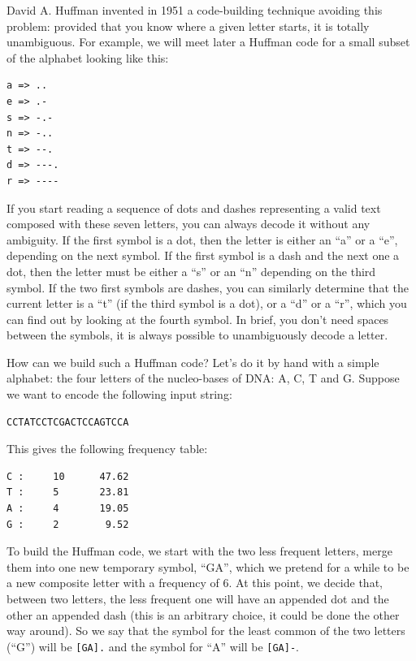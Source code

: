 David A. Huffman invented in 1951 a code-building technique avoiding 
this problem: provided that you know where a given letter starts, 
it is totally unambiguous. For example, we will meet later a Huffman 
code for a small subset of the alphabet looking like this:

\begin{verbatim}
a => ..
e => .-
s => -.-
n => -..
t => --.
d => ---.
r => ----
\end{verbatim}

If you start reading a sequence of dots and dashes representing a 
valid text composed with these seven letters, you can always decode 
it without any ambiguity. If the first symbol is a dot, then the letter 
is either an ``a'' or a ``e'', depending on the next symbol. If the 
first symbol is a dash and the next one a dot, then the letter must 
be either a ``s'' or an ``n'' depending on the third symbol. If the 
two first symbols are dashes, you can similarly determine that the 
current letter is a ``t'' (if the third symbol is a dot), or a ``d'' 
or a ``r'', which you can find out by looking at the fourth symbol. 
In brief, you don't need spaces between the symbols, it is always 
possible to unambiguously decode a letter.

How can we build such a Huffman code? Let's do it by hand with a 
simple alphabet: the four letters of the nucleo-bases of DNA: A, 
C, T and G. Suppose we want to encode the following input string:

\begin{verbatim}
CCTATCCTCGACTCCAGTCCA
\end{verbatim}

This gives the following frequency table:

\begin{verbatim}
C :     10      47.62
T :     5       23.81
A :     4       19.05
G :     2        9.52
\end{verbatim}

To build the Huffman code, we start with the two less frequent 
letters, merge them into one new temporary symbol, ``GA'', which 
we pretend for a while to be a new composite letter with a 
frequency of 6. At this point, we decide that, between two letters, 
the less frequent one will have an appended dot and the other 
an appended dash (this is an arbitrary choice, it could be done 
the other way around). So we say that the symbol for the least 
common of the two letters (``G'') will be \verb'[GA].' and the 
symbol for ``A'' will be \verb'[GA]-'. 

